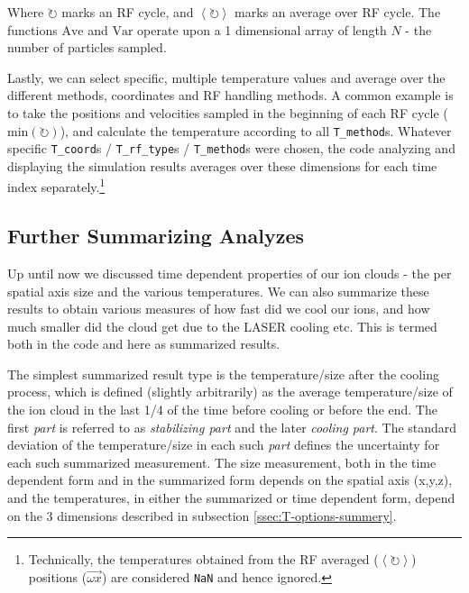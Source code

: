 Where $\circlearrowright$ marks an RF cycle, and $\left\langle\circlearrowright\right\rangle$ marks an average over RF cycle. The functions $\mathrm{Ave}$ and $\mathrm{Var}$ operate upon a 1 dimensional array of length $N$ - the number of particles sampled.

Lastly, we can select specific, multiple temperature values and average over the different methods, coordinates and RF handling methods. A common example is to take the positions and velocities sampled in the beginning of each RF cycle ($\mathrm{min}\left(\circlearrowright\right)$), and calculate the temperature according to all \texttt{T\_method}s. Whatever specific \texttt{T\_coord}s / \texttt{T\_rf\_type}s / \texttt{T\_method}s were chosen, the code analyzing and displaying the simulation results averages over these dimensions for each time index separately.\footnote{Technically, the temperatures obtained from the RF averaged ($\left\langle\circlearrowright\right\rangle$) positions ($\overrightarrow{\omega x}$) are considered \texttt{NaN} and hence ignored.}

\subsection{Further Summarizing Analyzes}\label{ssec:intro/SummarizedMeasurement}

Up until now we discussed time dependent properties of our ion clouds - the per spatial axis size and the various temperatures. We can also summarize these results to obtain various measures of how fast did we cool our ions, and how much smaller did the cloud get due to the LASER cooling etc. This is termed both in the code and here as summarized results.

The simplest summarized result type is the temperature/size after the cooling process, which is defined (slightly arbitrarily) as the average temperature/size of the ion cloud in the last 1/4 of the time before cooling or before the end. The first \textit{part} is referred to as \textit{stabilizing part} and the later \textit{cooling part}. The standard deviation of the temperature/size in each such \textit{part} defines the uncertainty for each such summarized measurement. The size measurement, both in the time dependent form and in the summarized form depends on the spatial axis (x,y,z), and the temperatures, in either the summarized or time dependent form, depend on the 3 dimensions described in subsection \ref{ssec:T-options-summery}.

